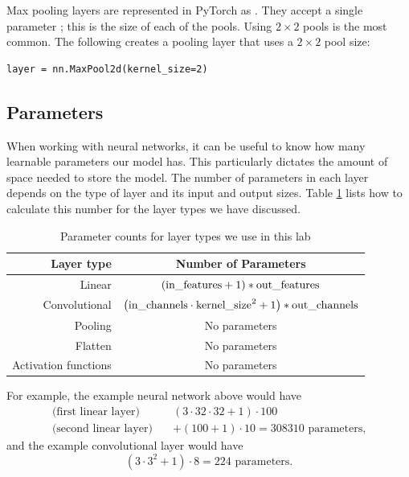 Max pooling layers are represented in PyTorch as .
They accept a single parameter ; this is the size of each of the pools.
Using \(2\times2\) pools is the most common.
The following creates a pooling layer that uses a \(2\times 2\) pool size:
\begin{lstlisting}
layer = nn.MaxPool2d(kernel_size=2)
\end{lstlisting}

\subsection*{Parameters}

When working with neural networks, it can be useful to know how many learnable parameters our model has.
This particularly dictates the amount of space needed to store the model.
The number of parameters in each layer depends on the type of layer and its input and output sizes.
Table \ref{table:param_cts} lists how to calculate this number for the layer types we have discussed.

\begin{table}
	\centering
	\begin{tabular}{r|c}
	Layer type & Number of Parameters \\
	\hline
	Linear & \((\lieq{in_features}+1)*\lieq{out_features}\) \\
	Convolutional & \(\left(\lieq{in_channels}\cdot \lieq{kernel_size}^2 + 1\right)*\lieq{out_channels}\) \\
	Pooling & No parameters \\
	Flatten & No parameters \\
	Activation functions & No parameters \\
	\end{tabular}
	\caption{Parameter counts for layer types we use in this lab}
	\label{table:param_cts}
\end{table}

For example, the example neural network above would have
\begin{align*}
\text{(first linear layer)}\quad\quad&
(3\cdot32\cdot 32+1)\cdot100
\\
\text{(second linear layer)}\quad&
+(100+1)\cdot10 = 308310 \text{ parameters,}
\end{align*}
and the example convolutional layer would have
\[
(3\cdot 3^2+1)\cdot 8 = 224 \text{ parameters.}
\]

